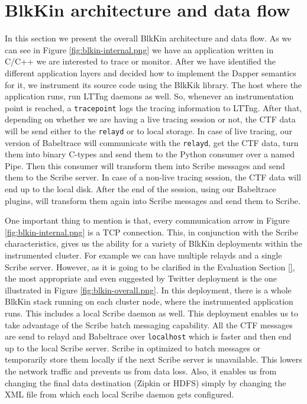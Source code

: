 \section{BlkKin architecture and data flow}\label{sec:flow}

In this section we present the overall BlkKin architecture and data flow. As we
can see in Figure \ref{fig:blkin-internal.png} we have an application written in
C/C++ we are interested to trace or monitor. After we have identified the
different application layers and decided how to implement the Dapper semantics
for it, we instrument its source code using the BlkKik library. The host where
the application runs, run LTTng daemons as well. So, whenever an instrumentation
point is reached, a \texttt{tracepoint} logs the tracing information to LTTng.
After that, depending on whether we are having a live tracing session or not,
the CTF data will be send either to the \texttt{relayd} or to local storage. In
case of live tracing, our version of Babeltrace will communicate with the
\texttt{relayd}, get the CTF data, turn them into binary C-types and send them
to the Python consumer over a named Pipe. Then this consumer will transform them
into Scribe messages and send them to the Scribe server. In case of a non-live
tracing session, the CTF data will end up to the local disk. After the end of
the session, using our Babeltrace plugins, will transform them again into Scribe
messages and send them to Scribe.

One important thing to mention is that, every communication arrow in Figure
\ref{fig:blkin-internal.png} is a TCP connection. This, in conjunction with the
Scribe characteristics, gives us the ability for a variety of BlkKin deployments
within the instrumented cluster. For example we can have multiple relayds and a
single Scribe server. However, as it is going to be clarified in the Evaluation
Section \ref{}, the most appropriate and even suggested by Twitter deployment is
the one illustrated in Figure \ref{fig:blkin-overall.png}.  In this deployment,
there is a whole BlkKin stack running on each cluster node, where the
instrumented application runs. This includes a local Scribe daemon as well. This
deployment enables us to take advantage of the Scribe batch messaging
capability. All the CTF messages are send to relayd and Babeltrace over
\texttt{localhost} which is faster and then end up to the local Scribe server.
Scribe in optimized to batch messages or temporarily store them locally if the
next Scribe server is unavailable. This lowers the network traffic and prevents
us from data loss. Also, it enables us from changing the final data destination
(Zipkin or HDFS) simply by changing the XML file from which each local Scribe
daemon gets configured. 
